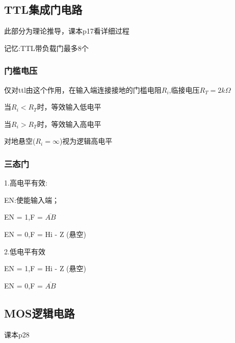 \documentclass[11pt,twoside,a4paper]{ctexart}
\begin{document}
    \subsection{TTL集成门电路}
    此部分为理论推导，课本p17看详细过程

    记忆:TTL带负载门最多8个

    \subsubsection{门槛电压}
    仅对ttl由这个作用，在输入端连接接地的门槛电阻$R_i$,临接电压$R_T = 2k\Omega $

    当$R_i < R_T$时，等效输入低电平

    当$R_i > R_T$时，等效输入高电平

    对地悬空($R_i = \infty$)视为逻辑高电平

    \subsubsection{三态门}

    1.高电平有效:
    
    EN:使能输入端；

    EN = 1,F = $\overline{AB} $

    EN = 0,F = Hi - Z (悬空)
    
    2.低电平有效

    EN = 1,F = Hi - Z (悬空)

    EN = 0,F = $\overline{AB} $
    \subsection{MOS逻辑电路}
    课本p28
\end{document}

